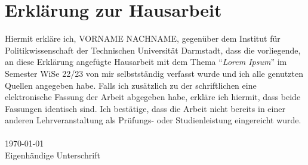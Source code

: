 \begin{doublespace}
\pagebreak

\pagebreak
\end{doublespace}
\printglossary[type=\acronymtype,title={Abkürzungsverzeichnis},nonumberlist]
\pagebreak
\section*{Erklärung zur Hausarbeit}
Hiermit erkläre ich, VORNAME NACHNAME, gegenüber dem Institut für Politikwissenschaft der Technischen Universität Darmstadt, dass die vorliegende, an diese Erklärung angefügte Hausarbeit mit dem Thema \enquote{\textit{Lorem Ipsum}} im Semester WiSe 22/23  von mir selbstständig verfasst wurde und ich alle genutzten Quellen angegeben habe. Falls ich zusätzlich zu der schriftlichen eine elektronische Fassung der Arbeit abgegeben habe, erkläre ich hiermit, dass beide Fassungen identisch sind. Ich bestätige, dass die Arbeit nicht bereits in einer anderen Lehrveranstaltung als Prüfungs- oder Studienleistung eingereicht wurde.\\
\\
\today \\
\newline
\newline
Eigenhändige Unterschrift
\newpage
\endcm